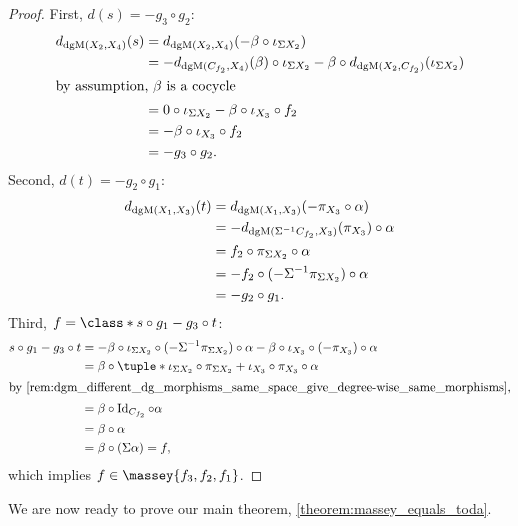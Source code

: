 \begin{proof}
    First, \( d(s) = -g_3 \circ g_2 \):
    \begin{align*}
        d_{\operatorname{dgM}(X_2, X_4)}(s) &= d_{\operatorname{dgM}(X_2, X_4)}(- \beta \circ \iota_{\Sigma X_2}) \\
        &= - d_{\operatorname{dgM}(C_{f_2}, X_4)}(\beta) \circ \iota_{\Sigma X_2} - \beta \circ d_{\operatorname{dgM}(X_2, C_{f_2})}(\iota_{\Sigma X_2}) \\
        \intertext{by assumption, \( \beta \) is a cocycle}
        &= 0 \circ \iota_{\Sigma X_2} - \beta \circ \iota_{X_3} \circ f_2 \\
        &= - \beta \circ \iota_{X_3} \circ f_2 \\
        &= - g_3 \circ g_2.
    \end{align*}
    Second, \( d(t) = - g_2 \circ g_1 \):
    \begin{align*}
         d_{\operatorname{dgM}(X_1, X_3)}(t) &= d_{\operatorname{dgM}(X_1, X_3)}(- \pi_{X_3} \circ \alpha) \\
         &= -d_{\operatorname{dgM}(\Sigma^{-1} C_{f_2}, X_3)}(\pi_{X_3}) \circ \alpha \\
         &= f_2 \circ \pi_{\Sigma X_2} \circ \alpha \\
         &= - f_2 \circ (- \Sigma^{-1} \pi_{\Sigma X_2}) \circ \alpha \\
         &= - g_2 \circ g_1.
    \end{align*}
    Third, \( f = \class*{s \circ g_1 - g_3 \circ t} \):
    \begin{align*}
        s \circ g_1 - g_3 \circ t &= - \beta \circ \iota_{\Sigma X_2} \circ (-\Sigma^{-1} \pi_{\Sigma X_2}) \circ \alpha - \beta \circ \iota_{X_3} \circ (- \pi_{X_3}) \circ \alpha \\
        &= \beta \circ \tuple*{\iota_{\Sigma X_2} \circ \pi_{\Sigma X_2} + \iota_{X_3} \circ \pi_{X_3}} \circ \alpha \\
        \intertext{by \autoref{rem:dgm_different_dg_morphisms_same_space_give_degree-wise_same_morphisms},}
        &= \beta \circ \Id_{C_{f_2}} \circ \alpha \\
        &= \beta \circ \alpha \\
        &= \beta \circ (\Sigma \alpha) = f,
    \end{align*}
    which implies \( f \in \massey{f_3, f_2, f_1} \).
\end{proof}

We are now ready to prove our main theorem, \autoref{theorem:massey_equals_toda}.

